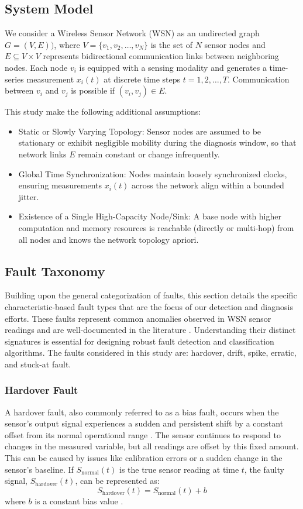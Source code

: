\subsection{System Model}
We consider a Wireless Sensor Network (WSN) as an undirected graph \(G=(V,E))\), where \(V=\{v_1, v_2, \ldots, v_N\}\) is the set of \(N\) sensor nodes and \(E \subseteq V \times V\) represents bidirectional communication links between neighboring nodes. Each node \(v_i\) is equipped with a sensing modality and generates a time-series measurement \(x_i(t)\) at discrete time steps \(t=1, 2, \ldots, T\). Communication between \(v_i\) and \(v_j\) is possible if \((v_i,v_j) \in E\). 

This study make the following additional assumptions:
\begin{itemize}
  \item Static or Slowly Varying Topology: Sensor nodes are assumed to be stationary or exhibit negligible mobility during the diagnosis window, so that network links \(E\) remain constant or change infrequently.
  \item Global Time Synchronization: Nodes maintain loosely synchronized clocks, ensuring measurements \(x_i(t)\) across the network align within a bounded jitter. 
  \item Existence of a Single High-Capacity Node/Sink: A base node with higher computation and memory resources is reachable (directly or multi-hop) from all nodes and knows the network topology apriori. 
\end{itemize}

\subsection{Fault Taxonomy}
\label{subsec:types}
Building upon the general categorization of faults, this section details the specific characteristic-based fault types that are the focus of our detection and diagnosis efforts. These faults represent common anomalies observed in WSN sensor readings and are well-documented in the literature \cite{Saeed2021, Hasan2024, Shi2024, Ni2009}. Understanding their distinct signatures is essential for designing robust fault detection and classification algorithms. The faults considered in this study are: hardover, drift, spike, erratic, and stuck-at fault. 

\subsubsection{Hardover Fault}
A hardover fault, also commonly referred to as a bias fault, occurs when the sensor's output signal experiences a sudden and persistent shift by a constant offset from its normal operational range \cite{Saeed2021, Shi2024, Hasan2024}. The sensor continues to respond to changes in the measured variable, but all readings are offset by this fixed amount. This can be caused by issues like calibration errors or a sudden change in the sensor's baseline. If \(S_\text{normal}(t)\) is the true sensor reading at time \(t\), the faulty signal, \(S_\text{hardover}(t)\), can be represented as:
\[S_\text{hardover}(t) = S_\text{normal}(t) + b\]
where \(b\) is a constant bias value \cite{Saeed2021}.

